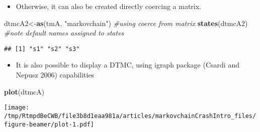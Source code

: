 \documentclass[ignorenonframetext,]{beamer}
\newenvironment{Shaded}{\begin{snugshade}}{\end{snugshade}}
\newcommand{\CommentTok}[1]{\textcolor[rgb]{0.56,0.35,0.01}{\textit{#1}}}
\newcommand{\KeywordTok}[1]{\textcolor[rgb]{0.13,0.29,0.53}{\textbf{#1}}}
\newcommand{\NormalTok}[1]{#1}
\newcommand{\StringTok}[1]{\textcolor[rgb]{0.31,0.60,0.02}{#1}}
\providecommand{\tightlist}{%
  \setlength{\itemsep}{0pt}\setlength{\parskip}{0pt}}
\providecommand{\tightlist}{
  \setlength{\itemsep}{0pt}\setlength{\parskip}{0pt}
}
\begin{document}
\begin{frame}[fragile]

\begin{itemize}
\tightlist
\item
  Otherwise, it can also be created directly coercing a matrix.
\end{itemize}

\begin{Shaded}
\begin{Highlighting}[]
\NormalTok{dtmcA2<-}\KeywordTok{as}\NormalTok{(tmA, }\StringTok{"markovchain"}\NormalTok{) }\CommentTok{#using coerce from matrix}
\KeywordTok{states}\NormalTok{(dtmcA2) }\CommentTok{#note default names assigned to states}
\end{Highlighting}
\end{Shaded}

\begin{verbatim}
## [1] "s1" "s2" "s3"
\end{verbatim}

\end{frame}

\begin{frame}[fragile]

\begin{itemize}
\tightlist
\item
  It is also possible to display a DTMC, using igraph package (Csardi
  and Nepusz 2006) capabilities
\end{itemize}

\begin{Shaded}
\begin{Highlighting}[]
\KeywordTok{plot}\NormalTok{(dtmcA)}
\end{Highlighting}
\end{Shaded}

\texttt{[image: /tmp/RtmpdBeCWB/file3b8d1eaa981a/articles/markovchainCrashIntro\_files/figure-beamer/plot-1.pdf]}

\end{frame}
\end{document}
